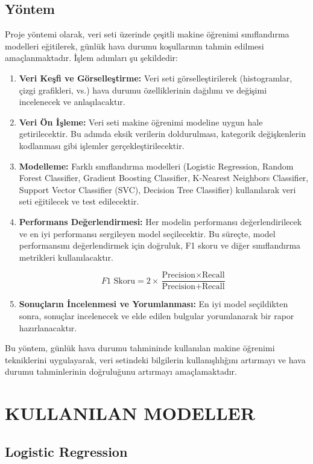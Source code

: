 \documentclass[twocolumn]{article}
\begin{document}
	\subsection{Yöntem}
	Proje yöntemi olarak, veri seti üzerinde çeşitli makine öğrenimi sınıflandırma modelleri eğitilerek, günlük hava durumu koşullarının tahmin edilmesi amaçlanmaktadır. İşlem adımları şu şekildedir:
	\begin{enumerate}
		\item \textbf{Veri Keşfi ve Görselleştirme:} Veri seti görselleştirilerek (histogramlar, çizgi grafikleri, vs.) hava durumu özelliklerinin dağılımı ve değişimi incelenecek ve anlaşılacaktır.
		\item \textbf{Veri Ön İşleme:} Veri seti makine öğrenimi modeline uygun hale getirilecektir. Bu adımda eksik verilerin doldurulması, kategorik değişkenlerin kodlanması gibi işlemler gerçekleştirilecektir.
		\item \textbf {Modelleme:} Farklı sınıflandırma modelleri (Logistic Regression, Random Forest Classifier, Gradient Boosting Classifier, K-Nearest Neighbors Classifier, Support Vector Classifier (SVC), Decision Tree Classifier) kullanılarak veri seti eğitilecek ve test edilecektir.
		\item \textbf{Performans Değerlendirmesi:} Her modelin performansı değerlendirilecek ve en iyi performansı sergileyen model seçilecektir. Bu süreçte, model performansını değerlendirmek için doğruluk, F1 skoru ve diğer sınıflandırma metrikleri kullanılacaktır.
		
		\[
		F1 \text{ Skoru} = 2 \times \frac{\text{Precision} \times \text{Recall}}{\text{Precision} + \text{Recall}}
		\]
		
		\item \textbf {Sonuçların İncelenmesi ve Yorumlanması:} En iyi model seçildikten sonra, sonuçlar incelenecek ve elde edilen bulgular yorumlanarak bir rapor hazırlanacaktır.
	\end{enumerate}
	Bu yöntem, günlük hava durumu tahmininde kullanılan makine öğrenimi tekniklerini uygulayarak, veri setindeki bilgilerin kullanışlılığını artırmayı ve hava durumu tahminlerinin doğruluğunu artırmayı amaçlamaktadır.
	
	\section{KULLANILAN MODELLER} 
	\subsection{Logistic Regression}
	
\end{document}
